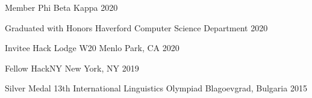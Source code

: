 
\begin{cvhonors}

  \cvhonor
    {Member}
    {Phi Beta Kappa}
    {}
    {2020}

  \cvhonor
    {Graduated with Honors}
    {Haverford Computer Science Department}
    {}
    {2020}

  \cvhonor
    {Invitee}
    {Hack Lodge W20}
    {Menlo Park, CA}
    {2020}

  \cvhonor
    {Fellow}
    {HackNY}
    {New York, NY}
    {2019}

  \cvhonor
    {Silver Medal}
    {13th International Linguistics Olympiad}
    {Blagoevgrad, Bulgaria}
    {2015}

\end{cvhonors}
